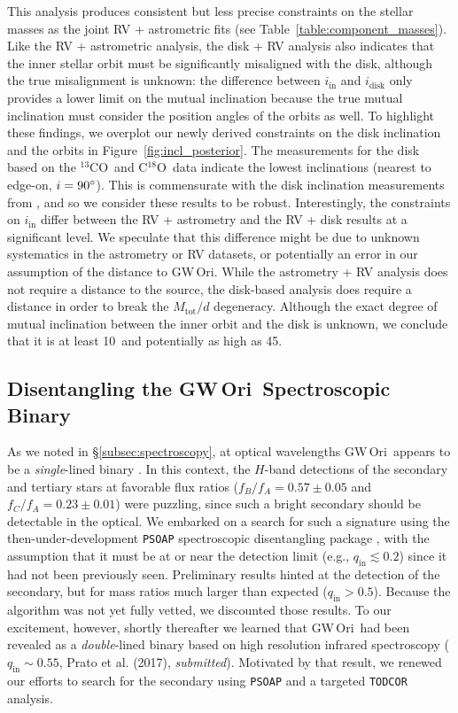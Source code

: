 \documentclass[twocolumn]{aastex61}
\newcommand{\obj}{GW\,Ori}
\newcommand{\thirteen}{${}^{13}$CO}
\newcommand{\eighteen}{C${}^{18}$O}
\begin{document}
This analysis produces consistent but less precise constraints on the stellar masses as the joint RV + astrometric fits (see Table~\ref{table:component_masses}). Like the RV + astrometric analysis, the disk + RV analysis also indicates that the inner stellar orbit must be significantly misaligned with the disk, although the true misalignment is unknown: the difference between $i_\mathrm{in}$ and $i_\mathrm{disk}$ only provides a lower limit on the mutual inclination because the true mutual inclination must consider the position angles of the orbits as well. To highlight these findings, we overplot our newly derived constraints on the disk inclination and the orbits in Figure~\ref{fig:incl_posterior}. The measurements for the disk based on the \thirteen\ and \eighteen\ data indicate the lowest inclinations (nearest to edge-on, $i = 90\mbox{$^\circ$}$). This is commensurate with the disk inclination measurements from \citet{fang17}, and so we consider these results to be robust. Interestingly, the constraints on $i_\mathrm{in}$ differ between the RV + astrometry and the RV + disk results at a significant level. We speculate that this difference might be due to unknown systematics in the astrometry or RV datasets, or potentially an error in our assumption of the distance to \obj. While the astrometry + RV analysis does not require a distance to the source, the disk-based analysis does require a distance in order to break the $M_\mathrm{tot} / d$ degeneracy. Although the exact degree of mutual inclination between the inner orbit and the disk is unknown, we conclude that it is at least 10\degr\ and potentially as high as 45\degr.



\subsection{Disentangling the \obj\ Spectroscopic Binary \label{subsec:disentangle}}

As we noted in \S\ref{subsec:spectroscopy}, at optical wavelengths \obj\ appears to be a \emph{single}-lined binary \citep{mathieu91,fang14}. In this context, the \citet{berger11} $H$-band detections of the secondary and tertiary stars at favorable flux ratios ($f_B / f_A = 0.57 \pm 0.05$ and $f_C / f_A = 0.23 \pm 0.01$) were puzzling, since such a bright secondary should be detectable in the optical. We embarked on a search for such a  signature using the then-under-development \texttt{PSOAP} spectroscopic disentangling package \citep{czekala17}, with the assumption that it must be at or near the detection limit (e.g., $q_\mathrm{in} \lesssim 0.2$) since it had not been previously seen. Preliminary results hinted at the detection of the secondary, but for mass ratios much larger than expected ($q_\mathrm{in} > 0.5$). Because the algorithm was not yet fully vetted, we discounted those results. To our excitement, however, shortly thereafter we learned that \obj\ had been revealed as a \emph{double}-lined binary based on high resolution infrared spectroscopy ($q_\mathrm{in} \sim 0.55$, Prato et al. (2017), \emph{submitted}). Motivated by that result, we renewed our efforts to search for the secondary using \texttt{PSOAP} and a targeted \texttt{TODCOR} analysis.
\end{document}
